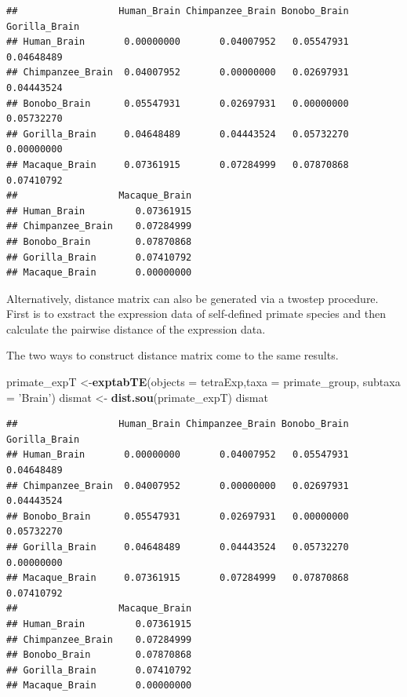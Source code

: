 \documentclass[]{book}
\newenvironment{Shaded}{\begin{snugshade}}{\end{snugshade}}
\newcommand{\DataTypeTok}[1]{\textcolor[rgb]{0.13,0.29,0.53}{#1}}
\newcommand{\KeywordTok}[1]{\textcolor[rgb]{0.13,0.29,0.53}{\textbf{#1}}}
\newcommand{\NormalTok}[1]{#1}
\newcommand{\StringTok}[1]{\textcolor[rgb]{0.31,0.60,0.02}{#1}}
\begin{document}
\begin{verbatim}
##                  Human_Brain Chimpanzee_Brain Bonobo_Brain Gorilla_Brain
## Human_Brain       0.00000000       0.04007952   0.05547931    0.04648489
## Chimpanzee_Brain  0.04007952       0.00000000   0.02697931    0.04443524
## Bonobo_Brain      0.05547931       0.02697931   0.00000000    0.05732270
## Gorilla_Brain     0.04648489       0.04443524   0.05732270    0.00000000
## Macaque_Brain     0.07361915       0.07284999   0.07870868    0.07410792
##                  Macaque_Brain
## Human_Brain         0.07361915
## Chimpanzee_Brain    0.07284999
## Bonobo_Brain        0.07870868
## Gorilla_Brain       0.07410792
## Macaque_Brain       0.00000000
\end{verbatim}

Alternatively, distance matrix can also be generated via a twostep procedure. First is to exstract the expression data of self-defined primate species and then calculate the pairwise distance of the expression data.

The two ways to construct distance matrix come to the same results.

\begin{Shaded}
\begin{Highlighting}[]
\NormalTok{primate_expT <-}\KeywordTok{exptabTE}\NormalTok{(}\DataTypeTok{objects =}\NormalTok{ tetraExp,}\DataTypeTok{taxa =}\NormalTok{ primate_group,}
                            \DataTypeTok{subtaxa =} \StringTok{'Brain'}\NormalTok{)}
\NormalTok{dismat <-}\StringTok{ }\KeywordTok{dist.sou}\NormalTok{(primate_expT)}
\NormalTok{dismat}
\end{Highlighting}
\end{Shaded}

\begin{verbatim}
##                  Human_Brain Chimpanzee_Brain Bonobo_Brain Gorilla_Brain
## Human_Brain       0.00000000       0.04007952   0.05547931    0.04648489
## Chimpanzee_Brain  0.04007952       0.00000000   0.02697931    0.04443524
## Bonobo_Brain      0.05547931       0.02697931   0.00000000    0.05732270
## Gorilla_Brain     0.04648489       0.04443524   0.05732270    0.00000000
## Macaque_Brain     0.07361915       0.07284999   0.07870868    0.07410792
##                  Macaque_Brain
## Human_Brain         0.07361915
## Chimpanzee_Brain    0.07284999
## Bonobo_Brain        0.07870868
## Gorilla_Brain       0.07410792
## Macaque_Brain       0.00000000
\end{verbatim}
\end{document}
